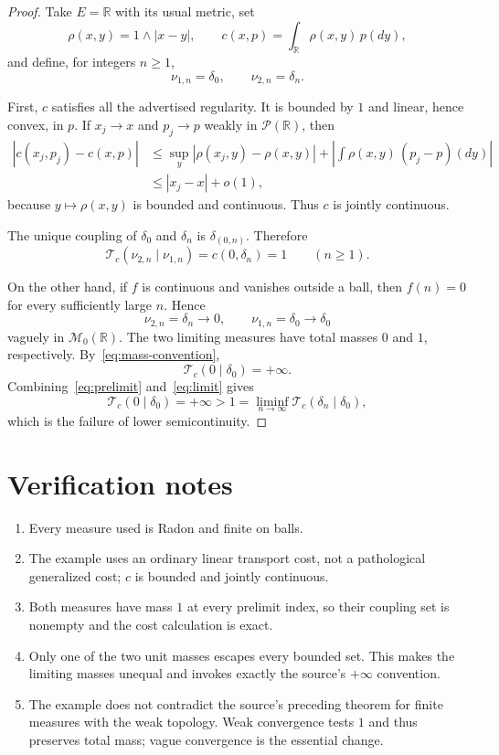 \documentclass[11pt]{article}
\newcommand{\Mc}{\mathcal M}
\newcommand{\Pc}{\mathcal P}
\newcommand{\Tc}{\mathcal T_c}
\begin{document}
\begin{proof}
Take $E=\mathbb R$ with its usual metric, set
\[
  \rho(x,y)=1\wedge|x-y|,
  \qquad
  c(x,p)=\int_{\mathbb R}\rho(x,y)\,p(dy),
\]
and define, for integers $n\ge1$,
\[
  \nu_{1,n}=\delta_0,
  \qquad
  \nu_{2,n}=\delta_n.
\]

First, $c$ satisfies all the advertised regularity.  It is bounded by $1$ and
linear, hence convex, in $p$.  If $x_j\to x$ and $p_j\to p$ weakly in
$\Pc(\mathbb R)$, then
\begin{align*}
 |c(x_j,p_j)-c(x,p)|
 &\le \sup_y|\rho(x_j,y)-\rho(x,y)|
   +\left|\int\rho(x,y)\,(p_j-p)(dy)\right|\\
 &\le |x_j-x|+o(1),
\end{align*}
because $y\mapsto\rho(x,y)$ is bounded and continuous.  Thus $c$ is jointly
continuous.

The unique coupling of $\delta_0$ and $\delta_n$ is
$\delta_{(0,n)}$.  Therefore
\begin{equation}\label{eq:prelimit}
 \Tc(\nu_{2,n}\mid\nu_{1,n})
 =c(0,\delta_n)=1
 \qquad(n\ge1).
\end{equation}

On the other hand, if $f$ is continuous and vanishes outside a ball, then
$f(n)=0$ for every sufficiently large $n$.  Hence
\[
 \nu_{2,n}=\delta_n\longrightarrow0,
 \qquad
 \nu_{1,n}=\delta_0\longrightarrow\delta_0
\]
vaguely in $\Mc_0(\mathbb R)$.  The two limiting measures have total masses
$0$ and $1$, respectively.  By~\eqref{eq:mass-convention},
\begin{equation}\label{eq:limit}
 \Tc(0\mid\delta_0)=+\infty.
\end{equation}
Combining~\eqref{eq:prelimit} and~\eqref{eq:limit} gives
\[
 \Tc(0\mid\delta_0)=+\infty
 >1
 =\liminf_{n\to\infty}\Tc(\delta_n\mid\delta_0),
\]
which is the failure of lower semicontinuity.
\end{proof}

\section{Verification notes}

\begin{enumerate}[leftmargin=2em]
\item Every measure used is Radon and finite on balls.
\item The example uses an ordinary linear transport cost, not a pathological
generalized cost; $c$ is bounded and jointly continuous.
\item Both measures have mass $1$ at every prelimit index, so their coupling
set is nonempty and the cost calculation is exact.
\item Only one of the two unit masses escapes every bounded set.  This makes
the limiting masses unequal and invokes exactly the source's $+\infty$
convention.
\item The example does not contradict the source's preceding theorem for
finite measures with the weak topology.  Weak convergence tests $1$ and thus
preserves total mass; vague convergence is the essential change.
\end{enumerate}
\end{document}
